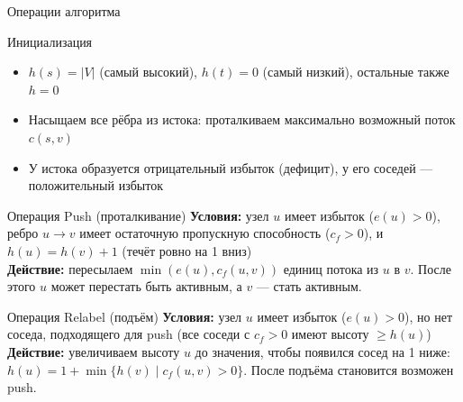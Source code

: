 \documentclass[14pt, aspectratio=169]{beamer}
\begin{document}
\begin{frame}{Операции алгоритма}
\scriptsize

\begin{block}{Инициализация}
\begin{itemize}
\item $h(s) = |V|$ (самый высокий), $h(t) = 0$ (самый низкий), остальные также $h = 0$
\item Насыщаем все рёбра из истока: проталкиваем максимально возможный поток $c(s, v)$
\item У истока образуется отрицательный избыток (дефицит), у его соседей — положительный избыток
\end{itemize}
\end{block}

\begin{block}{Операция Push (проталкивание)}
\textbf{Условия:} узел $u$ имеет избыток ($e(u) > 0$), ребро $u \to v$ имеет остаточную пропускную способность ($c_f > 0$), и $h(u) = h(v) + 1$ (течёт ровно на 1 вниз) \\
\textbf{Действие:} пересылаем $\min(e(u), c_f(u, v))$ единиц потока из $u$ в $v$. После этого $u$ может перестать быть активным, а $v$ — стать активным.
\end{block}

\begin{block}{Операция Relabel (подъём)}
\textbf{Условия:} узел $u$ имеет избыток ($e(u) > 0$), но нет соседа, подходящего для push (все соседи с $c_f > 0$ имеют высоту $\ge h(u)$) \\
\textbf{Действие:} увеличиваем высоту $u$ до значения, чтобы появился сосед на 1 ниже: $h(u) = 1 + \min\{h(v) \mid c_f(u, v) > 0\}$. После подъёма становится возможен push.
\end{block}

\end{frame}
\end{document}
